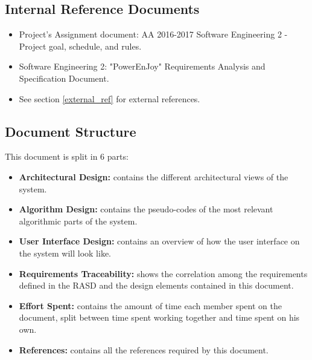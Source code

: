 \subsection{Internal Reference Documents}
\label{internal_ref}
\begin{itemize}
    \item Project’s Assignment document: AA 2016-2017 Software Engineering 2 - Project goal, schedule, and rules.
    \item Software Engineering 2: "PowerEnJoy" Requirements Analysis and Specification Document.
    \item See section \ref{external_ref} for external references.
\end{itemize}

\subsection{Document Structure}
This document is split in 6 parts:
\begin{itemize}
    \item \textbf{Architectural Design:} contains the different architectural views of the system.
    \item \textbf{Algorithm Design:} contains the pseudo-codes of the most relevant algorithmic parts of the system.
    \item \textbf{User Interface Design:} contains an overview of how the user interface on the system will look like.
    \item \textbf{Requirements Traceability:} shows the correlation among the requirements defined in the RASD and the design elements contained in this document.
    \item \textbf{Effort Spent:} contains the amount of time each member spent on the document, split between time spent working together and time spent on his own.
    \item \textbf{References:} contains all the references required by this document.
\end{itemize}
